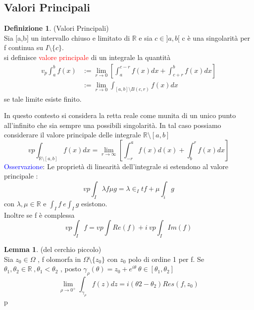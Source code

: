 \documentclass{article}
\theoremstyle{definition}
\newtheorem*{definizione}{Definizione}
\newtheorem*{lemma}{Lemma}
\newcommand{\R}{\mathbb{R}}
\newcommand{\la}{\lambda}
\begin{document}
\subsection{Valori Principali}
\begin{definizione}(Valori Principali)\\
	Sia [a,b] un intervallo chiuso e limitato di $\R$ e sia $c \in ]a,b[$ c è una singolarità per f continua su $I\setminus \{c\}$. \\ si definisce \textcolor{red}{valore principale} di un integrale la quantità 
	\begin{align*}
		v_p\int_{a}^{b}f(x)&:= \lim_{r \rightarrow 0} \left[\int_{a}^{c-r}f(x)dx+\int_{c+r}^{b}f(x)dx\right] \\
		&:=  \lim_{r \rightarrow 0} \int_{[a,b]\setminus B(c,r)} f(x)dx
		\end{align*}
		se tale limite esiste finito.
\end{definizione}
In questo contesto si considera la retta reale come munita di un unico punto all'infinito che sia sempre una possibili singolarità. In tal caso possiamo considerare il valore principale delle integrale $\R\setminus [a,b]$ 
$$vp \int_{\R \setminus [a,b]}f(x)dx=\lim_{r \rightarrow \infty}\left[\int_{-r}^{a}f(x)d(x)+\int_{b}^rf(x)dx\right]$$
\textcolor{blue}{Osservazione}: Le proprietà di linearità dell'integrale si estendono al valore principale : 
$$vp\int_I \la f \mu g= \la \in_It f + \mu \int_i g$$
con $\la,\mu \in \R$ e  $\int _I f \ e \int _I g$ esistono. \\
Inoltre se f è complessa 
$$vp \int_I f= vp \int Re(f) + i \ vp \int_I Im(f)$$
\begin{tcolorbox}

\begin{lemma}(del cerchio piccolo) \\
	Sia $z_0\in \Omega $ , f olomorfa in $\Omega \setminus \{z_0\}$  con $z_0$ polo di ordine 1 per f. Se $\theta_1 , \theta_2 \in \R \ , \theta_1 < \theta_2$ , posto $\gamma_\rho(\theta)=z_0+e^{i\theta} \ \theta \in [\theta_1,\theta_2]$ 
	$$\lim_{\rho \rightarrow 0^+} \int_{\gamma_{\rho}}f(z)dz= i (\theta2 -\theta_2)Res(f,z_0) $$
p\end{lemma}
\end{tcolorbox}
\end{document}
